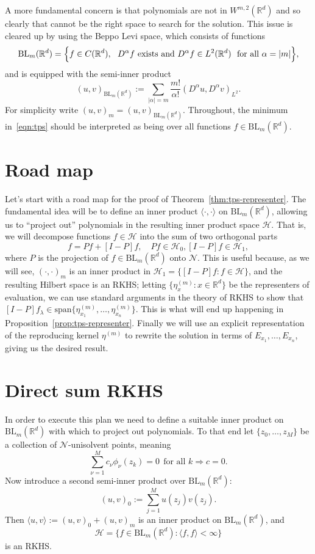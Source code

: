 \documentclass{article}
\def\BL{\mathrm{BL}}
\newcommand{\dotp}[2]{\langle #1, #2 \rangle}
\newcommand{\mc}[1]{\mathcal{#1}}
\newcommand{\Reals}{\mathbb{R}} %
\newcommand{\Rd}{\Reals^d}
\newcommand{\1}{\mathbf{1}}
\begin{document}
A more fundamental concern is that polynomials are not in $W^{m,2}(\Rd)$ and so clearly that cannot be the right space to search for the solution. This issue is cleared up by using the Beppo Levi space, which consists of functions
\begin{equation}
\mathrm{BL}_{m}(\Rd) = \Bigl\{f \in C(\Rd),~~ D^{\alpha} f~\textrm{exists and}~ D^{\alpha}f  \in L^2(\Rd)~~\textrm{for all $\alpha = |m|$} \Bigr\},
\end{equation}
and is equipped with the semi-inner product 
\begin{equation}
(u,v)_{\mathrm{BL}_{m}(\Rd)} := \sum_{|\alpha| = m} \frac{m!}{\alpha!} (D^{\alpha}u, D^{\alpha}v)_{L^2}.
\end{equation}
For simplicity write $(u,v)_{m} = (u,v)_{\mathrm{BL}_{m}(\Rd)}$. Throughout, the minimum in~\eqref{eqn:tps} should be interpreted as being over all functions $f \in \mathrm{BL}_m(\Rd)$.

\section{Road map}
Let's start with a road map for the proof of Theorem~\ref{thm:tps-representer}. The fundamental idea will be to define an inner product $\dotp{\cdot}{\cdot}$ on $\mathrm{BL}_{m}(\Rd)$, allowing us to ``project out'' polynomials in the resulting inner product space $\mc{H}$.  That is, we will decompose functions $f \in \mc{H}$ into the sum of two orthogonal parts $$f = Pf + [I - P]f, \quad Pf \in \mc{H}_0, [I - P]f \in \mc{H}_1,$$ where $P$ is the projection of $f \in \BL_m(\Rd)$ onto $\mc{N}$. This is useful because, as we will see, $(\cdot,\cdot)_{m}$ is an inner product in $\mc{H}_1 = \{[I - P]f: f \in \mc{H}\}$, and the resulting Hilbert space is an RKHS; letting $\{\eta_{x}^{(m)}: x \in \Rd\}$ be the representers of evaluation, we can use standard arguments in the theory of RKHS to show that $[I - P]f_{\lambda} \in \mathrm{span}\{\eta_{x_1}^{(m)},\ldots, \eta_{x_n}^{(m)}\}$. This is what will end up happening in Proposition~\ref{prop:tps-representer}. Finally we will use an explicit representation of the reproducing kernel $\eta^{(m)}$ to rewrite the solution in terms of $E_{x_1},\ldots,E_{x_n}$, giving us the desired result. 

\section{Direct sum RKHS}
In order to execute this plan we need to define a suitable inner product on $\mathrm{BL}_m(\Rd)$ with which to project out polynomials.  To that end let $\{z_0,\ldots,z_M\}$ be a collection of $\mc{N}$-unisolvent points, meaning
$$ \sum_{\nu = 1}^{M} c_{\nu} \phi_{\nu}(z_k) = 0 ~~\textrm{for all $k$} \Longrightarrow  c = 0.$$
Now introduce a second semi-inner product over $\mathrm{BL}_{m}(\Rd)$: 
\begin{equation}
\label{eqn:semi-inner-product}
(u,v)_{0} := \sum_{j = 1}^{M} u(z_j) v(z_j).
\end{equation}
Then $\dotp{u}{v} := (u,v)_0 + (u,v)_{m}$ is an inner product on $\mathrm{BL}_m(\Rd)$, and
$$\mc{H} = \{f \in \mathrm{BL}_{m}(\Rd):  \dotp{f}{f} < \infty\}$$ is an RKHS.
\end{document}

